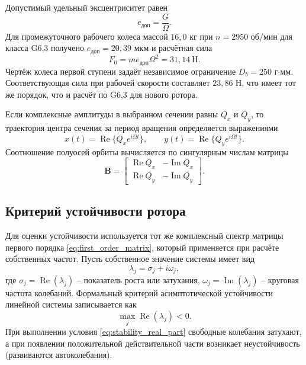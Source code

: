\documentclass[14pt,a4paper]{extarticle}
\numberwithin{equation}{section}
\numberwithin{figure}{section}
\numberwithin{table}{section}
\begin{document}
Допустимый удельный эксцентриситет равен
\begin{equation}
    e_{\text{доп}}=\frac{G}{\Omega}.
    \label{eq:balance_eccentricity}
\end{equation}
Для промежуточного рабочего колеса массой $16{,}0$ кг при $n=2950$ об/мин для класса G6,3 получено $e_{\text{доп}}=20{,}39$ мкм и расчётная сила
\begin{equation}
    F_0=m e_{\text{доп}}\Omega^2=31{,}14~\text{Н}.
    \label{eq:unbalance_force}
\end{equation}
Чертёж колеса первой ступени задаёт независимое ограничение $D_b=250$ г$\cdot$мм. Соответствующая сила при рабочей скорости составляет $23{,}86$ Н, что имеет тот же порядок, что и расчёт по G6,3 для нового ротора.

Если комплексные амплитуды в выбранном сечении равны $Q_x$ и $Q_y$, то траектория центра сечения за период вращения определяется выражениями
\begin{equation}
    x(t)=\operatorname{Re}\{Q_x e^{i\Omega t}\},\qquad
    y(t)=\operatorname{Re}\{Q_y e^{i\Omega t}\}.
    \label{eq:orbit_equations}
\end{equation}
Соотношение полуосей орбиты вычисляется по сингулярным числам матрицы
\begin{equation}
    \mathbf{B}=\begin{bmatrix}
    \operatorname{Re}Q_x&-\operatorname{Im}Q_x\\
    \operatorname{Re}Q_y&-\operatorname{Im}Q_y
    \end{bmatrix}.
    \label{eq:ellipse_axes}
\end{equation}




\subsection{Критерий устойчивости ротора}

Для оценки устойчивости используется тот же комплексный спектр матрицы первого порядка \eqref{eq:first_order_matrix}, который применяется при расчёте собственных частот. Пусть собственное значение системы имеет вид
\begin{equation}
    \lambda_j=\sigma_j+i\omega_j,
\end{equation}
где $\sigma_j=\operatorname{Re}(\lambda_j)$ -- показатель роста или затухания, $\omega_j=\operatorname{Im}(\lambda_j)$ -- круговая частота колебаний. Формальный критерий асимптотической устойчивости линейной системы записывается как
\begin{equation}
    \max_j \operatorname{Re}(\lambda_j)<0.
    \label{eq:stability_real_part}
\end{equation}
При выполнении условия \eqref{eq:stability_real_part} свободные колебания затухают, а при появлении положительной действительной части возникает неустойчивость (развиваются автоколебания).
\end{document}
